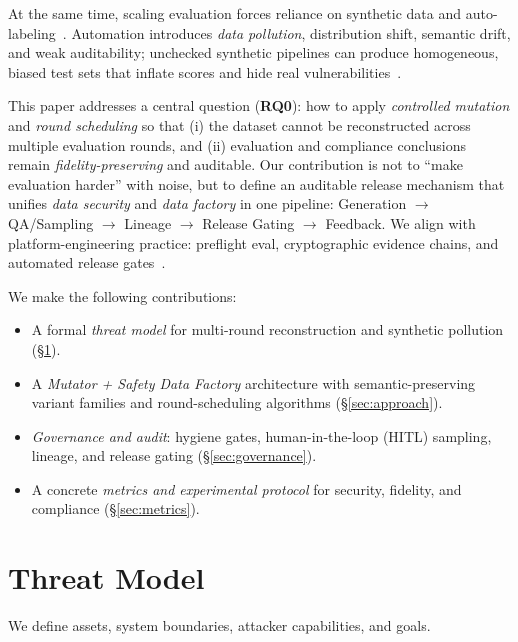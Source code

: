 \documentclass[letterpaper,twocolumn,10pt]{article}
\begin{document}
At the same time, scaling evaluation forces reliance on synthetic data and auto-labeling~\cite{synthetic-data-privacy-bias}. Automation introduces \emph{data pollution}, distribution shift, semantic drift, and weak auditability; unchecked synthetic pipelines can produce homogeneous, biased test sets that inflate scores and hide real vulnerabilities~\cite{synthetic-bias-ml}.

This paper addresses a central question (\textbf{RQ0}): how to apply \emph{controlled mutation} and \emph{round scheduling} so that (i) the dataset cannot be reconstructed across multiple evaluation rounds, and (ii) evaluation and compliance conclusions remain \emph{fidelity-preserving} and auditable. Our contribution is not to ``make evaluation harder'' with noise, but to define an auditable release mechanism that unifies \emph{data security} and \emph{data factory} in one pipeline: Generation $\rightarrow$ QA/Sampling $\rightarrow$ Lineage $\rightarrow$ Release Gating $\rightarrow$ Feedback. We align with platform-engineering practice: preflight eval, cryptographic evidence chains, and automated release gates~\cite{dual-use-attestations,one-eval}.

We make the following contributions:
\begin{itemize}
\item A formal \emph{threat model} for multi-round reconstruction and synthetic pollution (\S\ref{sec:threat}).
\item A \emph{Mutator + Safety Data Factory} architecture with semantic-preserving variant families and round-scheduling algorithms (\S\ref{sec:approach}).
\item \emph{Governance and audit}: hygiene gates, human-in-the-loop (HITL) sampling, lineage, and release gating (\S\ref{sec:governance}).
\item A concrete \emph{metrics and experimental protocol} for security, fidelity, and compliance (\S\ref{sec:metrics}).
\end{itemize}

\section{Threat Model}
\label{sec:threat}

We define assets, system boundaries, attacker capabilities, and goals.
\end{document}
